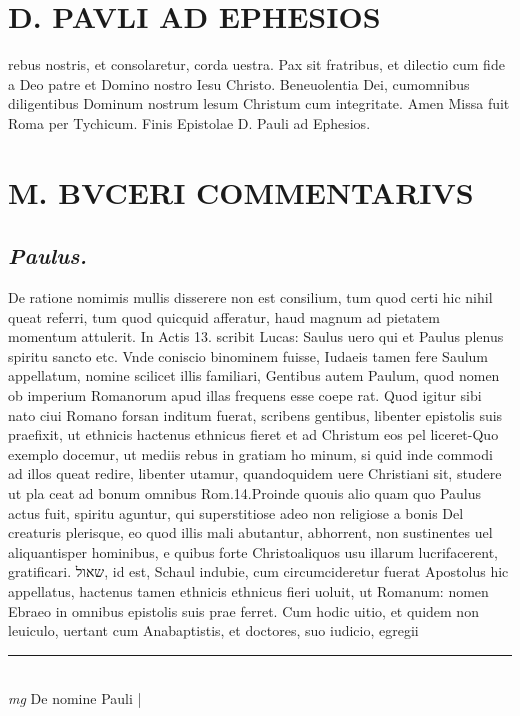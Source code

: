 \documentclass{article}
\begin{document}
\begin{pages}
\section*{D. PAVLI AD EPHESIOS }
\marginpar{[ p.9.  ]}\pstart rebus nostris, et consolaretur, corda uestra.  Pax sit fratribus, et dilectio cum fide a Deo patre et Domino nostro Iesu Christo. Beneuolentia Dei, cumomnibus diligentibus Dominum nostrum lesum Christum cum integritate. Amen Missa fuit Roma per Tychicum. Finis Epistolae D. Pauli ad Ephesios.  \pend
\section*{M. BVCERI COMMENTARIVS }
\marginpar{[ p.17 ]}
{}
\subsection*{\textit{Paulus. }}\pstart De ratione nomimis mullis disserere non est consilium, tum quod certi hic nihil queat referri, tum quod quicquid afferatur, haud magnum ad pietatem momentum attulerit. In Actis 13. scribit Lucas: Saulus uero qui et Paulus plenus spiritu sancto etc. Vnde coniscio binominem fuisse, Iudaeis tamen fere Saulum appellatum, nomine scilicet illis familiari, Gentibus autem Paulum, quod nomen ob imperium Romanorum apud illas frequens esse coepe rat. Quod igitur sibi nato ciui Romano forsan inditum fuerat, scribens gentibus, libenter epistolis suis praefixit, ut ethnicis hactenus ethnicus fieret et ad Christum eos pel liceret-Quo exemplo docemur, ut mediis rebus in gratiam ho minum, si quid inde commodi ad illos queat redire, libenter utamur, quandoquidem uere Christiani sit, studere ut pla ceat ad bonum omnibus Rom.14.Proinde quouis alio quam quo Paulus actus fuit, spiritu aguntur, qui superstitiose adeo non religiose a bonis Del creaturis plerisque, eo quod illis mali abutantur, abhorrent, non sustinentes uel aliquantisper hominibus, e quibus forte Christoaliquos usu illarum lucrifacerent, gratificari. שאול, id est, Schaul indubie, cum circumcideretur fuerat Apostolus hic appellatus, hactenus tamen ethnicis ethnicus fieri uoluit, ut Romanum: nomen Ebraeo in omnibus epistolis suis prae ferret. Cum hodic uitio, et quidem non leuiculo, uertant cum Anabaptistis, et doctores, suo iudicio, egregii  \pend
\vspace{0.5cm}\noindent
\vspace{0.2cm}\rule{1cm}{0.2pt}\\ 
\hspace{0.2cm}\textit{mg}
\footnotesize De nomine Pauli
\normalsize| 

\end{pages}
\end{document}
